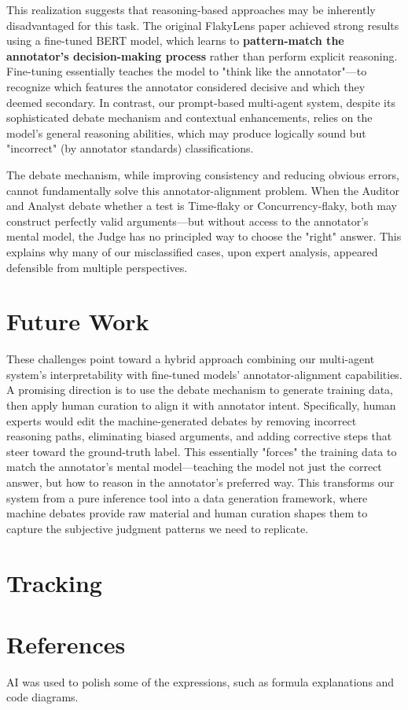 \documentclass{article}
\begin{document}
This realization suggests that reasoning-based approaches may be inherently disadvantaged for this task. The original FlakyLens paper achieved strong results using a fine-tuned BERT model, which learns to \textbf{pattern-match the annotator's decision-making process} rather than perform explicit reasoning. Fine-tuning essentially teaches the model to "think like the annotator"—to recognize which features the annotator considered decisive and which they deemed secondary. In contrast, our prompt-based multi-agent system, despite its sophisticated debate mechanism and contextual enhancements, relies on the model's general reasoning abilities, which may produce logically sound but "incorrect" (by annotator standards) classifications.

The debate mechanism, while improving consistency and reducing obvious errors, cannot fundamentally solve this annotator-alignment problem. When the Auditor and Analyst debate whether a test is Time-flaky or Concurrency-flaky, both may construct perfectly valid arguments—but without access to the annotator's mental model, the Judge has no principled way to choose the "right" answer. This explains why many of our misclassified cases, upon expert analysis, appeared defensible from multiple perspectives.



\section{Future Work}
These challenges point toward a hybrid approach combining our multi-agent system's interpretability with fine-tuned models' annotator-alignment capabilities. A promising direction is to use the debate mechanism to generate training data, then apply human curation to align it with annotator intent. Specifically, human experts would edit the machine-generated debates by removing incorrect reasoning paths, eliminating biased arguments, and adding corrective steps that steer toward the ground-truth label. This essentially "forces" the training data to match the annotator's mental model—teaching the model not just the correct answer, but how to reason in the annotator's preferred way. This transforms our system from a pure inference tool into a data generation framework, where machine debates provide raw material and human curation shapes them to capture the subjective judgment patterns we need to replicate.



\section{Tracking}


\section*{References}
AI was used to polish some of the expressions, such as formula explanations and code diagrams.
\end{document}
